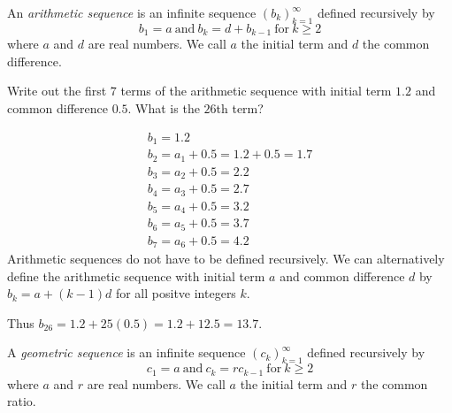 \begin{definition}
    An \emph{arithmetic sequence} is an infinite sequence \(\left(b_{k}\right)_{k=1}^{\infty}\) defined recursively by
    \[b_1 = a \ \textrm{and} \ b_k = d+b_{k-1} \ \textrm{for} \ k \ge 2\]
    where \(a\) and \(d\) are real numbers. We call \(a\) the initial term and \(d\) the common difference.
\end{definition}

\begin{example}
    Write out the first \(7\) terms of the arithmetic sequence with initial term \(1.2\) and common difference \(0.5\). What is the \(26\)th term?
    \begin{solution}
        \begin{gather*}
            b_1 = 1.2 \\
            b_2 = a_1 + 0.5 = 1.2+0.5 = 1.7 \\
            b_3 = a_2 + 0.5 = 2.2 \\
            b_4 = a_3 + 0.5 = 2.7 \\
            b_5 = a_4 + 0.5 = 3.2 \\
            b_6 = a_5 + 0.5 = 3.7 \\
            b_7 = a_6 + 0.5 = 4.2
        \end{gather*}
        Arithmetic sequences do not have to be defined recursively. We can alternatively define the arithmetic sequence with initial term \(a\) and common difference \(d\) by \(b_k = a+\left(k-1\right)d\) for all positve integers \(k.\)

        Thus \(b_{26} = 1.2 + 25(0.5) = 1.2+12.5 = 13.7.\)
    \end{solution}
\end{example}

\begin{definition}
    A \emph{geometric sequence} is an infinite sequence \(\left(c_{k}\right)_{k=1}^{\infty}\) defined recursively by
    \[c_1 = a \ \textrm{and} \ c_k = rc_{k-1} \ \textrm{for} \ k \ge 2\]
    where \(a\) and \(r\) are real numbers. We call \(a\) the initial term and \(r\) the common ratio.
\end{definition}


